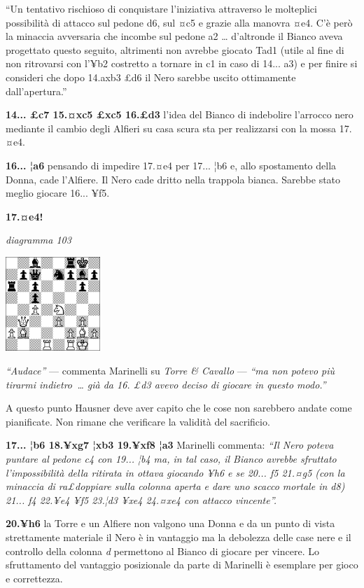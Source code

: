 \documentclass[
]{article}
\begin{document}
``Un tentativo rischioso di conquistare l'iniziativa attraverso le
molteplici possibilità di attacco sul pedone d6, sul ¤c5 e grazie alla
manovra ¤e4. C'è però la minaccia avversaria che incombe sul pedone a2
\ldots{} d'altronde il Bianco aveva progettato questo seguito,
altrimenti non avrebbe giocato Tad1 (utile al fine di non ritrovarsi con
l'¥b2 costretto a tornare in c1 in caso di 14... a3) e per finire si
consideri che dopo 14.axb3 £d6 il Nero sarebbe uscito ottimamente
dall'apertura.''

\textbf{14... £c7 15.¤xc5 £xc5 16.£d3} l'idea del Bianco di indebolire
l'arrocco nero mediante il cambio degli Alfieri su casa scura sta per
realizzarsi con la mossa 17.¤e4.

\textbf{16... ¦a6} pensando di impedire 17.¤e4 per 17... ¦b6 e, allo
spostamento della Donna, cade l'Alfiere. Il Nero cade dritto nella
trappola bianca. Sarebbe stato meglio giocare 16... ¥f5.

\textbf{17.¤e4!}

\emph{diagramma 103}

\includegraphics[width=1.40139in,height=1.40139in]{vertopal_109f12be458a423d8f3cc838880eaea2/media/image103.png}

\emph{``Audace''} --- commenta Marinelli su \emph{Torre \& Cavallo} ---
\emph{``ma non potevo più tirarmi indietro~\ldots{} già da 16. £d3 avevo
deciso di giocare in questo modo.''}

A questo punto Hausner deve aver capito che le cose non sarebbero andate
come pianificate. Non rimane che verificare la validità del sacrificio.

\textbf{17... ¦b6 18.¥xg7 ¦xb3 19.¥xf8 ¦a3} Marinelli commenta:
\emph{``Il Nero poteva puntare al pedone c4 con 19... ¦b4 ma, in tal
caso, il Bianco avrebbe sfruttato l'impossibilità della ritirata in
ottava giocando ¥h6 e se 20... f5 21.¤g5 (con la minaccia di ra£doppiare
sulla colonna aperta e dare uno scacco mortale in d8) 21... f4 22.¥e4
¥f5 23.¦d3 ¥xe4 24.¤xe4 con attacco vincente''.}

\textbf{20.¥h6} la Torre e un Alfiere non valgono una Donna e da un
punto di vista strettamente materiale il Nero è in vantaggio ma la
debolezza delle case nere e il controllo della colonna \emph{d}
permettono al Bianco di giocare per vincere. Lo sfruttamento del
vantaggio posizionale da parte di Marinelli è esemplare per gioco e
correttezza.
\end{document}

